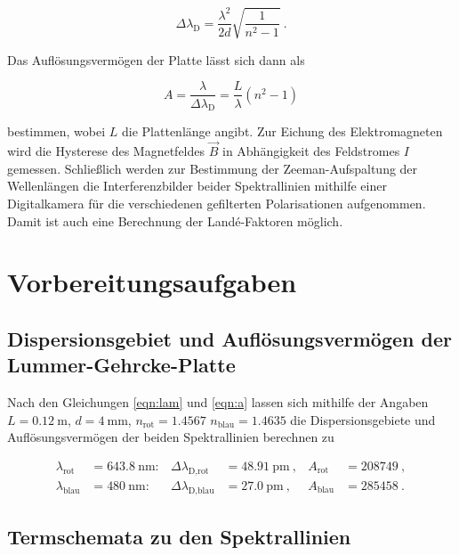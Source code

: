 \vspace{-15pt}
\begin{equation}
    \Delta \lambda_\text{D} = \frac{\lambda^2}{2d} \sqrt{\frac{1}{n^2-1}}\: .
    \label{eqn:lam}
\end{equation}

Das Auflösungsvermögen der Platte lässt sich dann als

\begin{equation}
    A = \frac{\lambda}{\Delta \lambda_\text{D}} = \frac{L}{\lambda} (n^2 -1)
    \label{eqn:a}
\end{equation}

bestimmen, wobei $L$ die Plattenlänge angibt.
Zur Eichung des Elektromagneten wird die Hysterese des Magnetfeldes $\vec{B}$ in Abhängigkeit
des Feldstromes $I$ gemessen. Schließlich werden zur Bestimmung der Zeeman-Aufspaltung der
Wellenlängen die Interferenzbilder beider Spektrallinien mithilfe einer Digitalkamera
für die verschiedenen gefilterten Polarisationen aufgenommen. Damit ist auch 
eine Berechnung der Landé-Faktoren möglich.

\section{Vorbereitungsaufgaben}

\subsection{Dispersionsgebiet und Auflösungsvermögen der Lummer-Gehrcke-Platte}

Nach den Gleichungen \eqref{eqn:lam} und \eqref{eqn:a} lassen sich mithilfe
der Angaben $L = \SI{0.12}{\meter}$, $d = \SI{4}{\milli\meter}$, $n_\text{rot} = \num{1.4567}$
$n_\text{blau} = \num{1.4635}$ die Dispersionsgebiete und Auflösungsvermögen der beiden 
Spektrallinien berechnen zu

\begin{align*}
    \lambda_\text{rot} &= \SI{643.8}{\nano\meter}: & \Delta \lambda_\text{D,rot} &= \SI{48.91}{\pico\meter}\:, & A_\text{rot} &= \num{208749}\:, \\
    \lambda_\text{blau} &= \SI{480}{\nano\meter}: & \Delta \lambda_\text{D,blau} &= \SI{27.0}{\pico\meter}\:, & A_\text{blau} &= \num{285458}\:. 
\end{align*}

\subsection{Termschemata zu den Spektrallinien}


